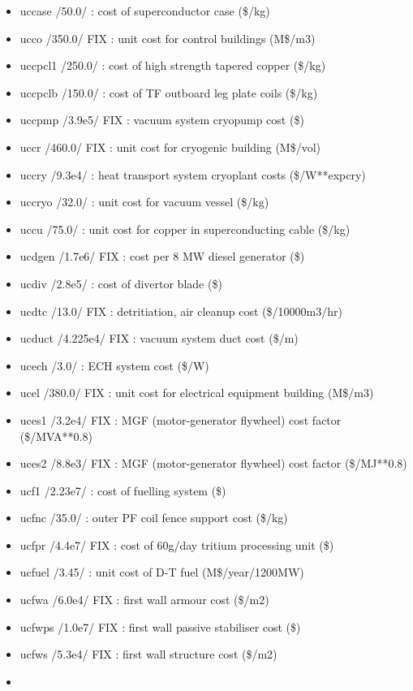 \documentclass[]{article}
\begin{document}
\begin{itemize}
\item
  uccase /50.0/ : cost of superconductor case (\$/kg)
\item
  ucco /350.0/ FIX : unit cost for control buildings (M\$/m3)
\item
  uccpcl1 /250.0/ : cost of high strength tapered copper (\$/kg)
\item
  uccpclb /150.0/ : cost of TF outboard leg plate coils (\$/kg)
\item
  uccpmp /3.9e5/ FIX : vacuum system cryopump cost (\$)
\item
  uccr /460.0/ FIX : unit cost for cryogenic building (M\$/vol)
\item
  uccry /9.3e4/ : heat transport system cryoplant costs (\$/W**expcry)
\item
  uccryo /32.0/ : unit cost for vacuum vessel (\$/kg)
\item
  uccu /75.0/ : unit cost for copper in superconducting cable (\$/kg)
\item
  ucdgen /1.7e6/ FIX : cost per 8 MW diesel generator (\$)
\item
  ucdiv /2.8e5/ : cost of divertor blade (\$)
\item
  ucdtc /13.0/ FIX : detritiation, air cleanup cost (\$/10000m3/hr)
\item
  ucduct /4.225e4/ FIX : vacuum system duct cost (\$/m)
\item
  ucech /3.0/ : ECH system cost (\$/W)
\item
  ucel /380.0/ FIX : unit cost for electrical equipment building
  (M\$/m3)
\item
  uces1 /3.2e4/ FIX : MGF (motor-generator flywheel) cost factor
  (\$/MVA**0.8)
\item
  uces2 /8.8e3/ FIX : MGF (motor-generator flywheel) cost factor
  (\$/MJ**0.8)
\item
  ucf1 /2.23e7/ : cost of fuelling system (\$)
\item
  ucfnc /35.0/ : outer PF coil fence support cost (\$/kg)
\item
  ucfpr /4.4e7/ FIX : cost of 60g/day tritium processing unit (\$)
\item
  ucfuel /3.45/ : unit cost of D-T fuel (M\$/year/1200MW)
\item
  ucfwa /6.0e4/ FIX : first wall armour cost (\$/m2)
\item
  ucfwps /1.0e7/ FIX : first wall passive stabiliser cost (\$)
\item
  ucfws /5.3e4/ FIX : first wall structure cost (\$/m2)
\item

\end{itemize}
\end{document}
